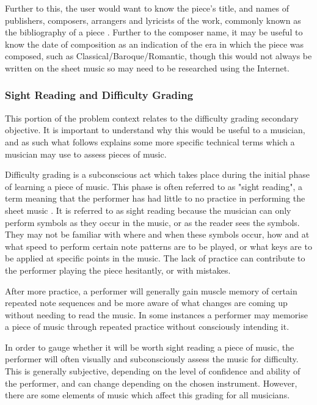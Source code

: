 Further to this, the user would want to know the piece's title, and names of publishers, composers, arrangers and lyricists of the work, commonly known as the bibliography of a piece \parencite{MIR}. Further to the composer name, it may be useful to know the date of composition as an indication of the era in which the piece was composed, such as Classical/Baroque/Romantic, though this would not always be written on the sheet music so may need to be researched using the Internet.

\subsubsection{Sight Reading and Difficulty Grading}
This portion of the problem context relates to the difficulty grading secondary objective. It is important to understand why this would be useful to a musician, and as such what follows explains some more specific technical terms which a musician may use to assess pieces of music.


Difficulty grading is a subconscious act which takes place during the initial phase of learning a piece of music. This phase is often referred to as "sight reading", a term meaning that the performer has had little to no practice in performing the sheet music \parencite{sightreading}.
 It is referred to as sight reading because the musician can only perform symbols as they occur in the music, or as the reader sees the symbols. They may not be familiar with where and when these symbols occur, how and at what speed to perform certain note patterns are to be played, or what keys are to be applied at specific points in the music. The lack of practice can contribute to the performer playing the piece hesitantly, or with mistakes.

After more practice, a performer will generally gain muscle memory of certain repeated note sequences and be more aware of what changes are coming up without needing to read the music. In some instances a performer may memorise a piece of music through repeated practice without consciously intending it. 

In order to gauge whether it will be worth sight reading a piece of music, the performer will often visually and subconsciously assess the music for difficulty. This is generally subjective, depending on the level of confidence and ability of the performer, and can change depending on the chosen instrument. However, there are some elements of music which affect this grading for all musicians.

